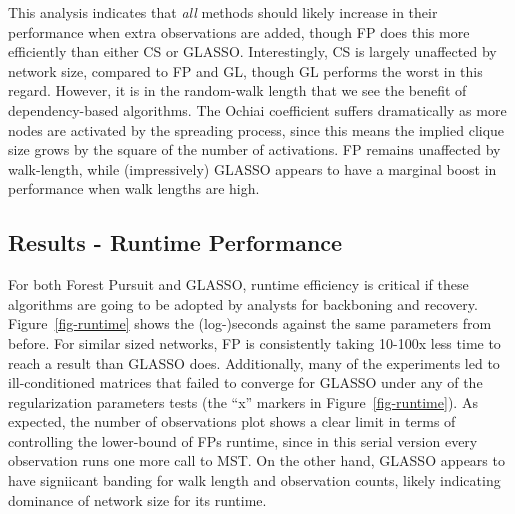 \documentclass[%
	12pt,
		oneside,
		letterpaper
]{book}
\begin{document}
This analysis indicates that \emph{all} methods should likely increase
in their performance when extra observations are added, though FP does
this more efficiently than either CS or GLASSO. Interestingly, CS is
largely unaffected by network size, compared to FP and GL, though GL
performs the worst in this regard. However, it is in the random-walk
length that we see the benefit of dependency-based algorithms. The
Ochiai coefficient suffers dramatically as more nodes are activated by
the spreading process, since this means the implied clique size grows by
the square of the number of activations. FP remains unaffected by
walk-length, while (impressively) GLASSO appears to have a marginal
boost in performance when walk lengths are high.

\subsection{Results - Runtime
Performance}\label{results---runtime-performance}

For both Forest Pursuit and GLASSO, runtime efficiency is critical if
these algorithms are going to be adopted by analysts for backboning and
recovery. Figure~\ref{fig-runtime} shows the (log-)seconds against the
same parameters from before. For similar sized networks, FP is
consistently taking 10-100x less time to reach a result than GLASSO
does. Additionally, many of the experiments led to ill-conditioned
matrices that failed to converge for GLASSO under any of the
regularization parameters tests (the ``x'' markers in
Figure~\ref{fig-runtime}). As expected, the number of observations plot
shows a clear limit in terms of controlling the lower-bound of FPs
runtime, since in this serial version every observation runs one more
call to MST. On the other hand, GLASSO appears to have signiicant
banding for walk length and observation counts, likely indicating
dominance of network size for its runtime.
\end{document}
